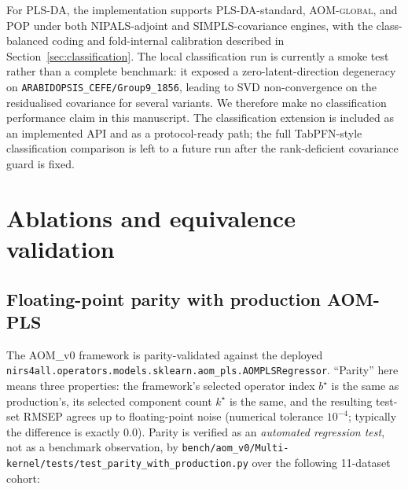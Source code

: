 \documentclass[review,a4paper]{elsarticle}
\newcommand{\AOM}{\textsc{AOM}\xspace}
\newcommand{\POP}{\textsc{POP}\xspace}
\newcommand{\PLSDA}{\textsc{PLS-DA}\xspace}
\newcommand{\NIPALS}{\textsc{NIPALS}\xspace}
\newcommand{\SIMPLS}{\textsc{SIMPLS}\xspace}
\begin{document}
For \PLSDA, the implementation supports \PLSDA-standard,
\AOM-\textsc{global}, and \POP under both \NIPALS-adjoint and
\SIMPLS-covariance engines, with the class-balanced coding and
fold-internal calibration described in Section~\ref{sec:classification}.
The local classification run is currently a smoke test rather than a
complete benchmark: it exposed a zero-latent-direction degeneracy on
\verb|ARABIDOPSIS_CEFE/Group9_1856|, leading to SVD non-convergence on
the residualised covariance for several variants. We therefore make no
classification performance claim in this manuscript. The classification
extension is included as an implemented API and as a protocol-ready
path; the full TabPFN-style classification comparison is left to a
future run after the rank-deficient covariance guard is fixed.

\section{Ablations and equivalence validation}\label{sec:ablations}

\subsection{Floating-point parity with production AOM-PLS}\label{sec:bit-parity}

The \AOM\_v0 framework is parity-validated against the deployed
\verb|nirs4all.operators.models.sklearn.aom_pls.AOMPLSRegressor|.
``Parity'' here means three properties: the framework's selected
operator index $b^\star$ is the same as production's, its selected
component count $k^\star$ is the same, and the resulting test-set RMSEP
agrees up to floating-point noise (numerical tolerance $10^{-4}$;
typically the difference is exactly $0.0$). Parity is verified as an
\emph{automated regression test}, not as a benchmark observation, by
\verb|bench/aom_v0/Multi-kernel/tests/test_parity_with_production.py| over the
following 11-dataset cohort:
\end{document}

